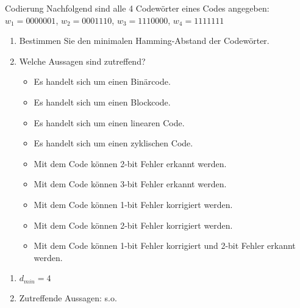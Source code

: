 \documentclass{article}
\begin{document}
\begin{exercise}{Codierung}
  Nachfolgend sind alle 4 Codewörter eines Codes angegeben:
  \centering $w_1 = 0000001$, $w_2 = 0001110$, $w_3 = 1110000$, $w_4 = 1111111$
  \begin{enumerate}
    \item Bestimmen Sie den minimalen Hamming-Abstand der Codewörter.
    \item Welche Aussagen sind zutreffend?
          \begin{itemize}
            \item Es handelt sich um einen Binärcode. \psolution{\checkmark}
            \item Es handelt sich um einen Blockcode. \psolution{\checkmark}
            \item Es handelt sich um einen linearen Code. \psolution{\xmark}
            \item Es handelt sich um einen zyklischen Code. \psolution{\checkmark}
            \item Mit dem Code können 2-bit Fehler erkannt werden. \psolution{\checkmark}
            \item Mit dem Code können 3-bit Fehler erkannt werden. \psolution{\checkmark}
            \item Mit dem Code können 1-bit Fehler korrigiert werden. \psolution{\checkmark}
            \item Mit dem Code können 2-bit Fehler korrigiert werden. \psolution{\xmark}
            \item Mit dem Code können 1-bit Fehler korrigiert und 2-bit Fehler erkannt werden. \psolution{\checkmark}
          \end{itemize}
  \end{enumerate}

  \begin{solution}
    \begin{enumerate}
      \item $d_{min} = 4$
      \item Zutreffende Aussagen: s.o.
    \end{enumerate}
  \end{solution}
\end{exercise}
\end{document}
